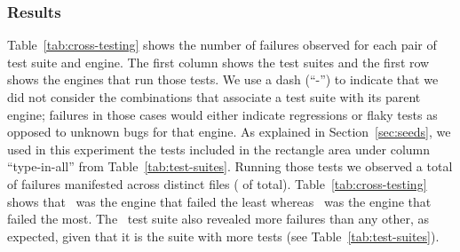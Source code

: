 \documentclass[smallextended]{svjour3}
\begin{document}
\subsubsection{Results}
\label{sec:results}

Table~\ref{tab:cross-testing} shows the number of failures observed
for each pair of test suite and engine. The first column shows the
test suites and the first row shows the engines that run those
tests. We use a dash (``-'') to indicate that we did not consider the
combinations that associate a test suite with its parent engine;
failures in those cases would either indicate regressions or flaky
tests as opposed to unknown bugs for that engine. As explained in
Section~\ref{sec:seeds}, we used in this experiment the
\totalTestFilesForTestTransplantation{} tests included in the
rectangle area under column ``type-in-all'' from
Table~\ref{tab:test-suites}. Running those tests we observed a total
of \failuresTestTrans{} failures manifested across
\failuresTestTransDistictFiles{} distinct files
(\failuresTestTransPercent{} of total).  Table~\ref{tab:cross-testing}
shows that \smonkey\ was the engine that failed the least whereas
\chakra\ was the engine that failed the most. The \smonkey\ test suite
also revealed more failures than any other, as expected, given
that it is the suite with more tests (see
Table~\ref{tab:test-suites}).


\end{document}
